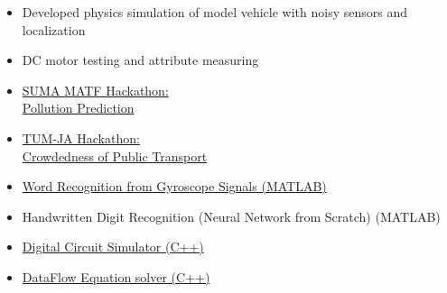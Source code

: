 \begin{itemize}
    \item   \small{Developed physics simulation of model vehicle with noisy sensors and localization}
    \item   \small{DC motor testing and attribute measuring} \\
\end{itemize}


    \begin{itemize}
        \item \href{https://github.com/basicskill/matf-hackathon}{SUMA MATF Hackathon: \\Pollution Prediction}
        \item \href{https://github.com/basicskill/tum-hackathon}{TUM-JA Hackathon: \\Crowdedness of Public Transport}

        \item \href{https://esveske.github.io/pdf/2016/PFE1605.pdf}{Word Recognition from Gyroscope Signals (MATLAB)}
        \item Handwritten Digit Recognition (Neural Network from Scratch) (MATLAB)
        \item \href{https://github.com/basicskill/OOP}{Digital Circuit Simulator (C++)}
        \item \href{https://github.com/basicskill/OOP}{DataFlow Equation solver (C++)}
    \end{itemize}

    
